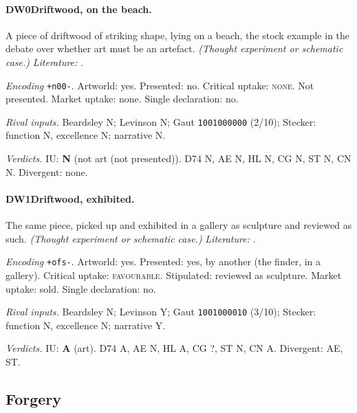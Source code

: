 \paragraph{DW0\enspace Driftwood, on the beach.}
A piece of driftwood of striking shape, lying on a beach, the stock example in the debate over whether art must be an artefact. \textit{(Thought experiment or schematic case.)} \textit{Literature:} \citet{Dickie1974}.\par
\noindent\textit{Encoding} \texttt{+n00-}. Artworld: yes. Presented: no. Critical uptake: \textsc{none}. Not presented. Market uptake: none. Single declaration: no.\par
\noindent\textit{Rival inputs.} Beardsley N; Levinson N; Gaut \texttt{1001000000} (2/10); Stecker: function N, excellence N; narrative N.\par
\noindent\textit{Verdicts.} IU: \textbf{N} (not art (not presented)). D74 N, AE N, HL N, CG N, ST N, CN N. Divergent: none.\par

\paragraph{DW1\enspace Driftwood, exhibited.}
The same piece, picked up and exhibited in a gallery as sculpture and reviewed as such. \textit{(Thought experiment or schematic case.)} \textit{Literature:} \citet{Dickie1974}.\par
\noindent\textit{Encoding} \texttt{+ofs-}. Artworld: yes. Presented: yes, by another (the finder, in a gallery). Critical uptake: \textsc{favourable}. Stipulated: reviewed as sculpture. Market uptake: sold. Single declaration: no.\par
\noindent\textit{Rival inputs.} Beardsley N; Levinson Y; Gaut \texttt{1001000010} (3/10); Stecker: function N, excellence N; narrative Y.\par
\noindent\textit{Verdicts.} IU: \textbf{A} (art). D74 A, AE N, HL A, CG ?, ST N, CN A. Divergent: AE, ST.\par

\subsection{Forgery}

